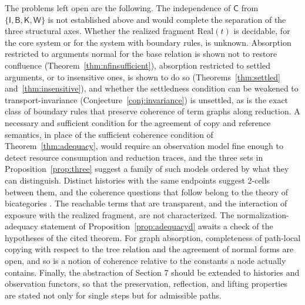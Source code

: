 \documentclass[11pt]{article}
\theoremstyle{definition}
\theoremstyle{remark}
\newcommand{\cI}{\mathsf{I}}
\newcommand{\cB}{\mathsf{B}}
\newcommand{\cC}{\mathsf{C}}
\newcommand{\cK}{\mathsf{K}}
\newcommand{\cW}{\mathsf{W}}
\newcommand{\Real}{\mathrm{Real}}
\begin{document}
The problems left open are the following. The independence of $\cC$ from $\{\cI,\cB,\cK,\cW\}$ is not established above and would complete the separation of the three structural axes. Whether the realized fragment $\Real(t)$ is decidable, for the core system or for the system with boundary rules, is unknown. Absorption restricted to arguments normal for the base relation is shown not to restore confluence (Theorem~\ref{thm:nfinsufficient}), absorption restricted to settled arguments, or to insensitive ones, is shown to do so (Theorems~\ref{thm:settled} and~\ref{thm:insensitive}), and whether the settledness condition can be weakened to transport-invariance (Conjecture~\ref{conj:invariance}) is unsettled, as is the exact class of boundary rules that preserve coherence of term graphs along reduction. A necessary and sufficient condition for the agreement of copy and reference semantics, in place of the sufficient coherence condition of Theorem~\ref{thm:adequacy}, would require an observation model fine enough to detect resource consumption and reduction traces, and the three sets in Proposition~\ref{prop:three} suggest a family of such models ordered by what they can distinguish. Distinct histories with the same endpoints suggest 2-cells between them, and the coherence questions that follow belong to the theory of bicategories \citep{lack2010}. The reachable terms that are transparent, and the interaction of exposure with the realized fragment, are not characterized. The normalization-adequacy statement of Proposition~\ref{prop:adequacyd} awaits a check of the hypotheses of the cited theorem. For graph absorption, completeness of path-local copying with respect to the tree relation and the agreement of normal forms are open, and so is a notion of coherence relative to the constants a node actually contains. Finally, the abstraction of Section 7 should be extended to histories and observation functors, so that the preservation, reflection, and lifting properties are stated not only for single steps but for admissible paths.
\end{document}
